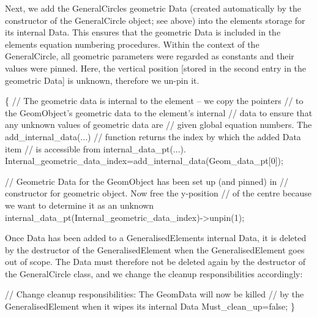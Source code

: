 Next, we add the {\ttfamily General\+Circle\textquotesingle{}s} geometric {\ttfamily Data} (created automatically by the constructor of the {\ttfamily General\+Circle} object; see above) into the element\textquotesingle{}s storage for its internal {\ttfamily Data}. This ensures that the geometric {\ttfamily Data} is included in the element\textquotesingle{}s equation numbering procedures. Within the context of the {\ttfamily General\+Circle}, all geometric parameters were regarded as constants and their values were pinned. Here, the vertical position \mbox{[}stored in the second entry in the geometric {\ttfamily Data}\mbox{]} is unknown, therefore we un-\/pin it.


\begin{DoxyCodeInclude}
  \{
   \textcolor{comment}{// The geometric data is internal to the element -- we copy the pointers}
   \textcolor{comment}{// to the GeomObject's geometric data to the element's internal }
   \textcolor{comment}{// data to ensure that any unknown values of geometric data are }
   \textcolor{comment}{// given global equation numbers. The add\_internal\_data(...)}
   \textcolor{comment}{// function returns the index by which the added Data item}
   \textcolor{comment}{// is accessible from internal\_data\_pt(...). }
   Internal\_geometric\_data\_index=add\_internal\_data(Geom\_data\_pt[0]);

   \textcolor{comment}{// Geometric Data for the GeomObject has been set up (and pinned) in}
   \textcolor{comment}{// constructor for geometric object. Now free the y-position }
   \textcolor{comment}{// of the centre because we want to determine it as an unknown}
   internal\_data\_pt(Internal\_geometric\_data\_index)->unpin(1);

\end{DoxyCodeInclude}


Once {\ttfamily Data} has been added to a {\ttfamily Generalised\+Element\textquotesingle{}s} internal {\ttfamily Data}, it is deleted by the destructor of the {\ttfamily Generalised\+Element} when the {\ttfamily Generalised\+Element} goes out of scope. The {\ttfamily Data} must therefore not be deleted again by the destructor of the {\ttfamily General\+Circle} class, and we change the cleanup responsibilities accordingly\+:

 
\begin{DoxyCodeInclude}
   \textcolor{comment}{// Change cleanup responsibilities: The GeomData will now be killed}
   \textcolor{comment}{// by the GeneralisedElement when it wipes its internal Data}
   Must\_clean\_up=\textcolor{keyword}{false};
  \}

\end{DoxyCodeInclude}


